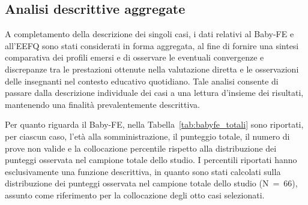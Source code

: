 \FloatBarrier

 \subsection{Analisi descrittive aggregate}
 \label{sec:4_3_3}

A completamento della descrizione dei singoli casi, i dati relativi al Baby-FE e all'EEFQ sono stati considerati in forma aggregata, al fine di fornire una sintesi comparativa dei profili emersi e di osservare le eventuali convergenze e discrepanze tra le prestazioni ottenute nella valutazione diretta e le osservazioni delle insegnanti nel contesto educativo quotidiano. Tale analisi consente di passare dalla descrizione individuale dei casi a una lettura d'insieme dei risultati, mantenendo una finalità prevalentemente descrittiva.

Per quanto riguarda il Baby-FE, nella Tabella~\ref{tab:babyfe_totali} sono riportati, per ciascun caso, l'età alla somministrazione, il punteggio totale, il numero di prove non valide e la collocazione percentile rispetto alla distribuzione dei punteggi osservata nel campione totale dello studio. I percentili riportati hanno esclusivamente una funzione descrittiva, in quanto sono stati calcolati sulla distribuzione dei punteggi osservata nel campione totale dello studio (N~=~66), assunto come riferimento per la collocazione degli otto casi selezionati.

